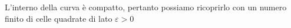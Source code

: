 \documentclass[preview]{standalone}
\begin{document}
\begin{center}
L'interno della curva è compatto, pertanto possiamo ricoprirlo con un numero \\finito di celle quadrate di lato $\varepsilon > 0$
\end{center}
\end{document}
